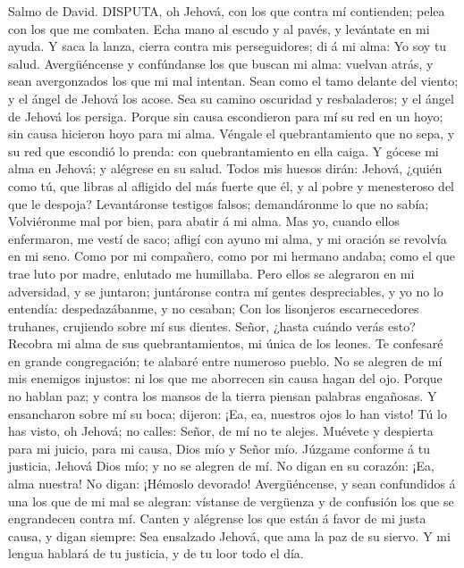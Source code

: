  Salmo de David. DISPUTA, oh Jehová, con los que contra mí
contienden; pelea con los que me combaten.  Echa mano al
escudo y al pavés, y levántate en mi ayuda.  Y saca la
lanza, cierra contra mis perseguidores; di á mi alma: Yo soy tu salud.
 Avergüéncense y confúndanse los que buscan mi alma: vuelvan
atrás, y sean avergonzados los que mi mal intentan.  Sean
como el tamo delante del viento; y el ángel de Jehová los acose.
 Sea su camino oscuridad y resbaladeros; y el ángel de
Jehová los persiga.  Porque sin causa escondieron para mí su
red en un hoyo; sin causa hicieron hoyo para mi alma. 
Véngale el quebrantamiento que no sepa, y su red que escondió lo prenda:
con quebrantamiento en ella caiga.  Y gócese mi alma en
Jehová; y alégrese en su salud.  Todos mis huesos dirán:
Jehová, ¿quién como tú, que libras al afligido del más fuerte que él, y
al pobre y menesteroso del que le despoja?  Levantáronse
testigos falsos; demandáronme lo que no sabía;  Volviéronme
mal por bien, para abatir á mi alma.  Mas yo, cuando ellos
enfermaron, me vestí de saco; afligí con ayuno mi alma, y mi oración se
revolvía en mi seno.  Como por mi compañero, como por mi
hermano andaba; como el que trae luto por madre, enlutado me humillaba.
 Pero ellos se alegraron en mi adversidad, y se juntaron;
juntáronse contra mí gentes despreciables, y yo no lo entendía:
despedazábanme, y no cesaban;  Con los lisonjeros
escarnecedores truhanes, crujiendo sobre mí sus dientes. 
Señor, ¿hasta cuándo verás esto? Recobra mi alma de sus
quebrantamientos, mi única de los leones.  Te confesaré en
grande congregación; te alabaré entre numeroso pueblo.  No
se alegren de mí mis enemigos injustos: ni los que me aborrecen sin
causa hagan del ojo.  Porque no hablan paz; y contra los
mansos de la tierra piensan palabras engañosas.  Y
ensancharon sobre mí su boca; dijeron: ¡Ea, ea, nuestros ojos lo han
visto!  Tú lo has visto, oh Jehová; no calles: Señor, de mí
no te alejes.  Muévete y despierta para mi juicio, para mi
causa, Dios mío y Señor mío.  Júzgame conforme á tu
justicia, Jehová Dios mío; y no se alegren de mí.  No digan
en su corazón: ¡Ea, alma nuestra! No digan: ¡Hémoslo devorado!
 Avergüéncense, y sean confundidos á una los que de mi mal
se alegran: vístanse de vergüenza y de confusión los que se engrandecen
contra mí.  Canten y alégrense los que están á favor de mi
justa causa, y digan siempre: Sea ensalzado Jehová, que ama la paz de su
siervo.  Y mi lengua hablará de tu justicia, y de tu loor
todo el día.

